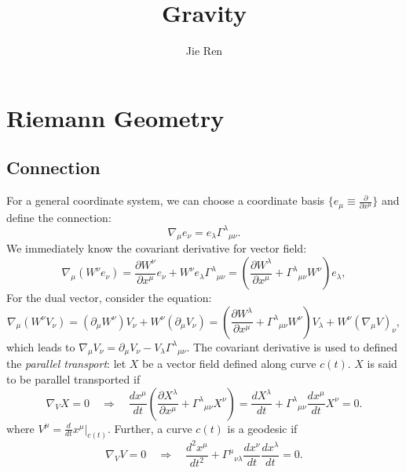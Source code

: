 \documentclass[aps,prb,superscriptaddress,nofootinbib]{revtex4}
\begin{document}
\title{Gravity}
\author{Jie Ren}


\maketitle


\tableofcontents

\section{Riemann Geometry}

\subsection{Connection}
For a general coordinate system, we can choose a coordinate basis $\{e_\mu \equiv \frac{\partial}{\partial x^\mu}\}$ and define the connection: 
\begin{equation}\label{eq:connection}
	\nabla_\mu e_\nu = e_\lambda{\Gamma^\lambda}_{\mu\nu}.
\end{equation}
We immediately know the covariant derivative for vector field:
\begin{equation}
	\nabla_\mu (W^\nu e_\nu) = \frac{\partial W^\nu}{\partial x^\mu} e_\nu + W^\nu e_\lambda {\Gamma^\lambda}_{\mu\nu} = \left(\frac{\partial W^\lambda}{\partial x^\mu} +{\Gamma^\lambda}_{\mu\nu} W^\nu \right) e_\lambda,  
\end{equation}
For the dual vector, consider the equation:
\begin{equation}
	\nabla_\mu (W^\nu V_\nu) = (\partial_\mu W^\nu) V_\nu + W^\nu (\partial_\mu V_\nu)
	= \left(\frac{\partial W^\lambda}{\partial x^\mu} +{\Gamma^\lambda}_{\mu\nu} W^\nu \right)V_\lambda + W^\nu (\nabla_\mu V)_\nu,
\end{equation}
which leads to $\nabla_\mu V_\nu = \partial_\mu V_\nu -V_\lambda {\Gamma^\lambda}_{\mu\nu}$.
The covariant derivative is used to defined the \textit{parallel transport}: let $X$ be a vector field defined along curve $c(t)$.
$X$ is said to be parallel transported if
\begin{equation}
	\nabla_V X = 0 \quad \Longrightarrow \quad 
	\frac{d x^\mu}{dt}\left(\frac{\partial X^\lambda}{\partial x^\mu} +{\Gamma^\lambda}_{\mu\nu} X^\nu \right) = \frac{d X^\lambda}{dt} +{\Gamma^\lambda}_{\mu\nu} \frac{dx^\mu}{dt} X^\nu = 0.
\end{equation}
where $V^\mu = \frac{d}{dt} x^\mu|_{c(t)}$.
Further, a curve $c(t)$ is a geodesic if
\begin{equation}
	\nabla_V V = 0 \quad \Longrightarrow \quad
	\frac{d^2 x^\mu}{dt^2} + {\Gamma^\mu}_{\nu\lambda} \frac{dx^\nu}{dt}\frac{dx^\lambda}{dt} = 0.
\end{equation}
\end{document}
